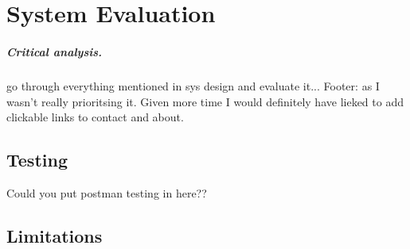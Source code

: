 \chapter{System Evaluation}
\paragraph{Critical analysis.}
go through everything mentioned in sys design and evaluate it...
Footer:  as I wasn't really prioritsing it. Given more time I would definitely have lieked to add clickable links to contact and about.
\section{Testing}
Could you put postman testing in here??

\section{Limitations}
